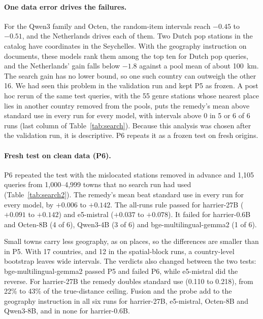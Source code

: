 \paragraph{One data error drives the failures.}
For the Qwen3 family and Octen, the random-item intervals reach $-0.45$ to $-0.51$, and the Netherlands drives each of them. Two Dutch pop stations in the catalog have coordinates in the Seychelles. With the geography instruction on documents, these models rank them among the top ten for Dutch pop queries, and the Netherlands' gain falls below $-1.8$ against a pool mean of about 100~km. The search gain has no lower bound, so one such country can outweigh the other 16. We had seen this problem in the validation run and kept P5 as frozen. A post hoc rerun of the same test queries, with the 55 genre stations whose nearest place lies in another country removed from the pools, puts the remedy's mean above standard use in every run for every model, with intervals above 0 in 5 or 6 of 6 runs (last column of Table~\ref{tab:search}). Because this analysis was chosen after the validation run, it is descriptive. P6 repeats it as a frozen test on fresh origins.

\paragraph{Fresh test on clean data (P6).}
P6 repeated the test with the mislocated stations removed in advance and 1,105 queries from 1,000--4,999 towns that no search run had used (Table~\ref{tab:search2}). The remedy's mean beat standard use in every run for every model, by $+0.006$ to $+0.142$. The all-runs rule passed for harrier-27B ($+0.091$ to $+0.142$) and e5-mistral ($+0.037$ to $+0.078$). It failed for harrier-0.6B and Octen-8B (4 of 6), Qwen3-4B (3 of 6) and bge-multilingual-gemma2 (1 of 6).

Small towns carry less geography, as on places, so the differences are smaller than in P5. With 17 countries, and 12 in the spatial-block runs, a country-level bootstrap leaves wide intervals. The verdicts also changed between the two tests: bge-multilingual-gemma2 passed P5 and failed P6, while e5-mistral did the reverse. For harrier-27B the remedy doubles standard use (0.110 to 0.218), from 22\% to 43\% of the true-distance ceiling. Fusion and the probe add to the geography instruction in all six runs for harrier-27B, e5-mistral, Octen-8B and Qwen3-8B, and in none for harrier-0.6B.

